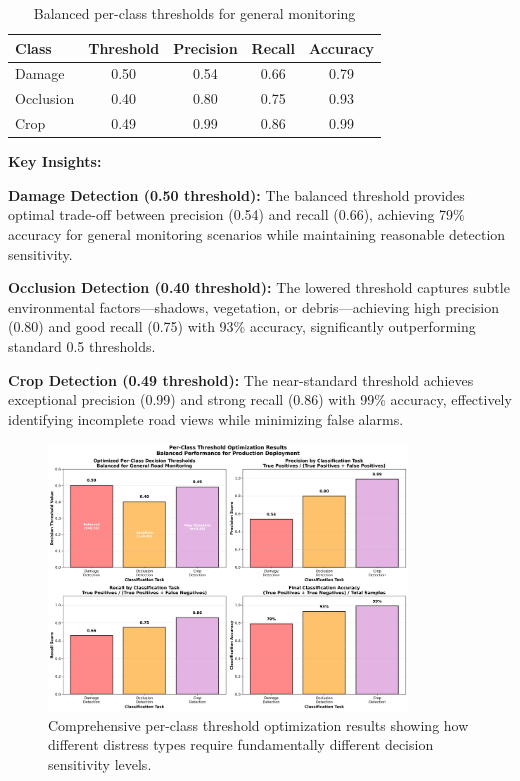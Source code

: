 \documentclass[12pt]{article}
\begin{document}
\begin{table}[!h]
\centering
\begin{tabular}{lcccc}
\toprule
\textbf{Class} & \textbf{Threshold} & \textbf{Precision} & \textbf{Recall} & \textbf{Accuracy} \\
\midrule
Damage & 0.50 & 0.54 & 0.66 & 0.79 \\
Occlusion & 0.40 & 0.80 & 0.75 & 0.93 \\
Crop & 0.49 & 0.99 & 0.86 & 0.99 \\
\bottomrule
\end{tabular}
\caption{Balanced per-class thresholds for general monitoring}
\end{table}

\noindent\textbf{Key Insights:}

\textbf{Damage Detection (0.50 threshold):} The balanced threshold provides optimal trade-off between precision (0.54) and recall (0.66), achieving 79\% accuracy for general monitoring scenarios while maintaining reasonable detection sensitivity.

\textbf{Occlusion Detection (0.40 threshold):} The lowered threshold captures subtle environmental factors—shadows, vegetation, or debris—achieving high precision (0.80) and good recall (0.75) with 93\% accuracy, significantly outperforming standard 0.5 thresholds.

\textbf{Crop Detection (0.49 threshold):} The near-standard threshold achieves exceptional precision (0.99) and strong recall (0.86) with 99\% accuracy, effectively identifying incomplete road views while minimizing false alarms.

\begin{figure}[!htb]
\centering
\includegraphics[width=0.85\textwidth]{images/threshold_optimization_analysis.png}
\caption{Comprehensive per-class threshold optimization results showing how different distress types require fundamentally different decision sensitivity levels.}
\end{figure}
\end{document}
